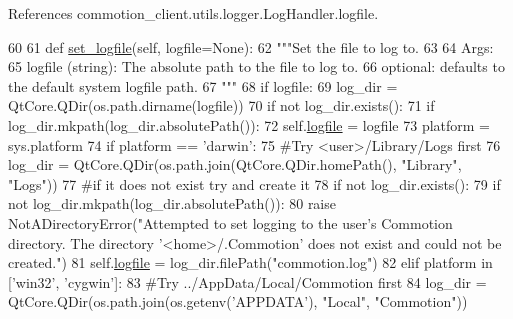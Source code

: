 References commotion\-\_\-client.\-utils.\-logger.\-Log\-Handler.\-logfile.


\begin{DoxyCode}
60 
61     \textcolor{keyword}{def }\hyperlink{classcommotion__client_1_1utils_1_1logger_1_1LogHandler_a1d1431f7384b19dc25e176361b7eeb23}{set\_logfile}(self, logfile=None):
62         \textcolor{stringliteral}{"""Set the file to log to.}
63 \textcolor{stringliteral}{        }
64 \textcolor{stringliteral}{        Args:}
65 \textcolor{stringliteral}{        logfile (string): The absolute path to the file to log to.}
66 \textcolor{stringliteral}{          optional: defaults to the default system logfile path.}
67 \textcolor{stringliteral}{        """}
68         \textcolor{keywordflow}{if} logfile:
69             log\_dir = QtCore.QDir(os.path.dirname(logfile))
70             \textcolor{keywordflow}{if} \textcolor{keywordflow}{not} log\_dir.exists():
71                 \textcolor{keywordflow}{if} log\_dir.mkpath(log\_dir.absolutePath()):
72                     self.\hyperlink{classcommotion__client_1_1utils_1_1logger_1_1LogHandler_a92d313ddde96b6e1765514f4596f26f2}{logfile} = logfile
73         platform = sys.platform
74         \textcolor{keywordflow}{if} platform == \textcolor{stringliteral}{'darwin'}:
75             \textcolor{comment}{#Try <user>/Library/Logs first}
76             log\_dir = QtCore.QDir(os.path.join(QtCore.QDir.homePath(), \textcolor{stringliteral}{"Library"}, \textcolor{stringliteral}{"Logs"}))
77             \textcolor{comment}{#if it does not exist try and create it}
78             \textcolor{keywordflow}{if} \textcolor{keywordflow}{not} log\_dir.exists():
79                 \textcolor{keywordflow}{if} \textcolor{keywordflow}{not} log\_dir.mkpath(log\_dir.absolutePath()):
80                     \textcolor{keywordflow}{raise} NotADirectoryError(\textcolor{stringliteral}{"Attempted to set logging to the user's Commotion directory.
       The directory '<home>/.Commotion' does not exist and could not be created."})
81             self.\hyperlink{classcommotion__client_1_1utils_1_1logger_1_1LogHandler_a92d313ddde96b6e1765514f4596f26f2}{logfile} = log\_dir.filePath(\textcolor{stringliteral}{"commotion.log"})
82         \textcolor{keywordflow}{elif} platform \textcolor{keywordflow}{in} [\textcolor{stringliteral}{'win32'}, \textcolor{stringliteral}{'cygwin'}]:
83             \textcolor{comment}{#Try ../AppData/Local/Commotion first}
84             log\_dir = QtCore.QDir(os.path.join(os.getenv(\textcolor{stringliteral}{'APPDATA'}), \textcolor{stringliteral}{"Local"}, \textcolor{stringliteral}{"Commotion"}))

\end{DoxyCode}
